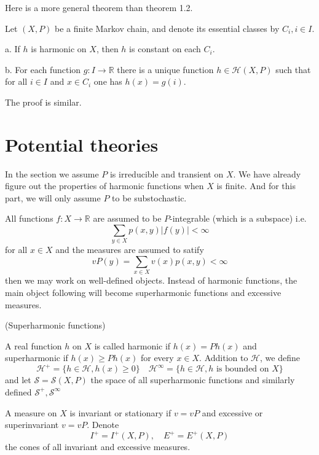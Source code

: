 \documentclass[lang=en,11pt,a4paper,citestyle =authoryear]{elegantpaper}
\newcommand{\R}{\mathbb{R}}
\newcommand{\Har}{\mathcal{H}}
\newcommand{\Sar}{\mathcal{S}}
\begin{document}
Here is a more general theorem than theorem 1.2.

\begin{theorem}
    Let $(X,P)$ be a finite Markov chain, and denote its essential classes by $C_i, i\in I$.\par
    a. If $h$ is harmonic on $X$, then $h$ is constant on each $C_i$.\par
    b. For each function $g:I\to\R$ there is a unique function $h\in\Har(X,P)$ such that for all $i\in I$ and $x\in C_i$ one has $h(x) = g(i)$.
\end{theorem}

The proof is similar.
\newpage

\section{Potential theories}

In the section we assume $P$ is irreducible and transient on $X$. We have already figure out the properties of harmonic functions when $X$ is finite. And for this part, we will only assume $P$ to be substochastic. \par
All functions $f:X\to\R$ are assumed to be $P$-integrable (which is a subspace) i.e.
    \[
    \sum\limits_{y\in X}p(x,y)|f(y)| < \infty
    \]
    for all $x\in X$ and the measures are assumed to satify
    \[vP(y) = \sum\limits_{x\in X}v(x)p(x,y) < \infty\]
    then we may work on well-defined objects. Instead of harmonic functions, the main object following will become superharmonic functions and excessive measures.\par

\begin{definition}
    (Superharmonic functions)\par
    A real function $h$ on $X$ is called harmonic if $h(x) = Ph(x)$ and superharmonic if $h(x) \geq Ph(x)$ for every $x\in X$. Addition to $\Har$, we define
    \[
    \Har^+ = \{h\in \Har, h(x)\geq 0\}\quad \Har^{\infty} = \{h \in \Har, h\text{ is bounded on }X\}
    \]
    and let $\Sar = \Sar (X,P)$ the space of all superharmonic functions and similarly defined $\Sar^+,\Sar^{\infty}$
\end{definition}

\begin{definition}
    A measure on $X$ is invariant or stationary if $v= vP$ and excessive or superinvariant $v=vP$. Denote \[I^+ = I^+(X,P), \quad E^+ = E^+(X,P)\] the cones of all invariant and excessive measures.
\end{definition}
\end{document}
